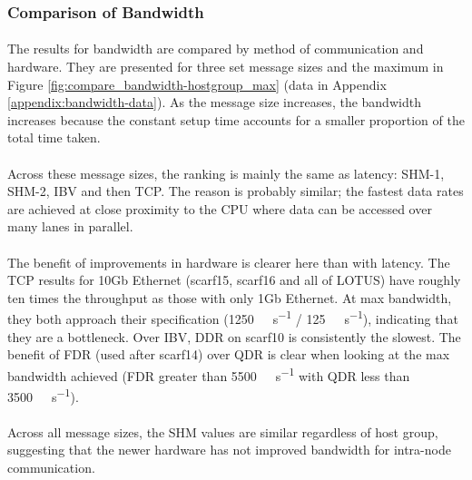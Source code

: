 \documentclass{article}
\begin{document}
            \subsubsection{Comparison of Bandwidth}
            \label{analyse-results-imb-bandwidth}

            \paragraph{}
            The results for bandwidth are compared by method of communication and hardware. They are presented for three set message sizes and the maximum in Figure \ref{fig:compare_bandwidth-hostgroup_max} (data in Appendix \ref{appendix:bandwidth-data}). As the message size increases, the bandwidth increases because the constant setup time accounts for a smaller proportion of the total time taken.

            \paragraph{}
            Across these message sizes, the ranking is mainly the same as latency: SHM-1, SHM-2, IBV and then TCP. The reason is probably similar; the fastest data rates are achieved at close proximity to the CPU where data can be accessed over many lanes in parallel.

            \paragraph{}
            The benefit of improvements in hardware is clearer here than with latency. The TCP results for 10Gb Ethernet (scarf15, scarf16 and all of LOTUS) have roughly ten times the throughput as those with only 1Gb Ethernet. At max bandwidth, they both approach their specification (\SI{1250}{\mega\byte\per\second} / \SI{125}{\mega\byte\per\second}), indicating that they are a bottleneck. Over IBV, DDR on scarf10 is consistently the slowest. The benefit of FDR (used after scarf14) over QDR is clear when looking at the max bandwidth achieved (FDR greater than \SI{5500}{\mega\byte\per\second} with QDR less than \SI{3500}{\mega\byte\per\second}).

            \paragraph{}
            Across all message sizes, the SHM values are similar regardless of host group, suggesting that the newer hardware has not improved bandwidth for intra-node communication.
\end{document}

